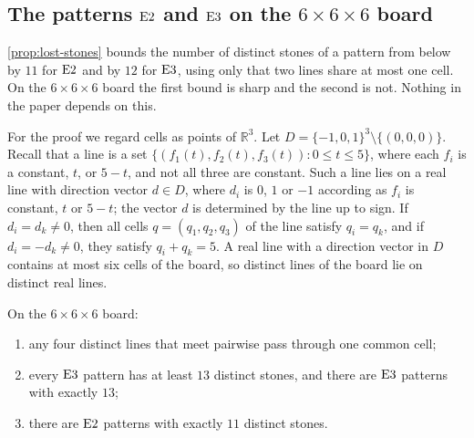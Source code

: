 \subsection{The patterns \texorpdfstring{$\mathrm{E2}$}{E2} and \texorpdfstring{$\mathrm{E3}$}{E3} on the
\texorpdfstring{$6\times6\times6$}{6x6x6} board}\label{sec:extra-e23}

\cref{prop:lost-stones} bounds the number of distinct stones of a pattern from below by $11$ for
$\mathrm{E2}$ and by $12$ for $\mathrm{E3}$, using only that two lines share at most one cell. On the
$6\times6\times6$ board the first bound is sharp and the second is not. Nothing in the paper depends on
this.

For the proof we regard cells as points of $\mathbb{R}^3$. Let
$D=\{-1,0,1\}^3\setminus\{(0,0,0)\}$. Recall that a line is a set $\{(f_1(t),f_2(t),f_3(t)):0\le t\le 5\}$,
where each $f_i$ is a constant, $t$, or $5-t$, and not all three are constant. Such a line lies on a real
line with direction vector $d\in D$, where $d_i$ is $0$, $1$ or $-1$ according as $f_i$ is constant, $t$ or
$5-t$; the vector $d$ is determined by the line up to sign. If $d_i=d_k\ne 0$, then all cells
$q=(q_1,q_2,q_3)$ of the line satisfy $q_i=q_k$, and if $d_i=-d_k\ne 0$, they satisfy $q_i+q_k=5$. A real line
with a direction vector in $D$ contains at most six cells of the board, so distinct lines of the board lie
on distinct real lines.

\begin{proposition}\label{prop:e23-min}
On the $6\times6\times6$ board:
\begin{enumerate}[label=\textup{(\alph*)},leftmargin=2.4em]
\item any four distinct lines that meet pairwise pass through one common cell;
\item every $\mathrm{E3}$ pattern has at least $13$ distinct stones, and there are $\mathrm{E3}$ patterns with
  exactly $13$;
\item there are $\mathrm{E2}$ patterns with exactly $11$ distinct stones.
\end{enumerate}
\end{proposition}

